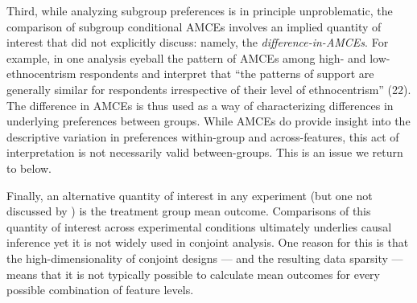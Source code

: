 \documentclass[a4paper,12pt]{article}\usepackage[]{graphicx}\usepackage[]{color}
\begin{document}
Third, while analyzing subgroup preferences is in principle unproblematic, the comparison of subgroup conditional AMCEs involves an implied quantity of interest that \citet{HainmuellerHopkinsYamamoto2014} did not explicitly discuss: namely, the \textit{difference-in-AMCEs}. For example, in one analysis \citet{HainmuellerHopkinsYamamoto2014} eyeball the pattern of AMCEs among high- and low-ethnocentrism respondents and interpret that ``the patterns of support are generally similar for respondents irrespective of their level of ethnocentrism'' (22). The difference in AMCEs is thus used as a way of characterizing differences in underlying preferences between groups. While AMCEs do provide insight into the descriptive variation in preferences within-group and across-features, this act of interpretation is not necessarily valid between-groups. This is an issue we return to below.


Finally, an alternative quantity of interest in any experiment (but one not discussed by \citealt{HainmuellerHopkinsYamamoto2014}) is the treatment group mean outcome. Comparisons of this quantity of interest across experimental conditions ultimately underlies causal inference yet it is not widely used in conjoint analysis. One reason for this is that the high-dimensionality of conjoint designs --- and the resulting data sparsity --- means that it is not typically possible to calculate mean outcomes for every possible combination of feature levels.
\end{document}
